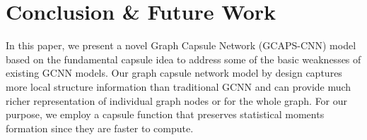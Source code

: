 \documentclass{article}
\begin{document}



\section{Conclusion \& Future Work }

In this paper, we present a novel    Graph Capsule Network (GCAPS-CNN)  model based on the fundamental capsule idea to address some of the basic weaknesses of existing GCNN models. Our graph capsule network model by design   captures more local structure information than traditional GCNN and can   provide much richer representation of individual graph nodes or for the whole graph. For our purpose, we employ a capsule function that preserves statistical moments formation  since they are faster to compute. 
\end{document}
